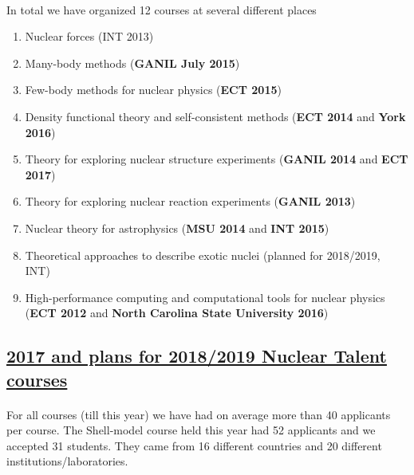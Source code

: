 \documentclass[%
oneside,                 %
final,                   %
10pt]{article}
\begin{document}
\paragraph{}
In total we have organized 12 courses at several different places
\begin{enumerate}
\item Nuclear forces (INT 2013)

\item Many-body methods (\textbf{GANIL July 2015})

\item Few-body methods for nuclear physics (\textbf{ECT 2015})

\item Density functional theory and self-consistent methods (\textbf{ECT 2014} and \textbf{York 2016})

\item Theory for exploring nuclear structure experiments (\textbf{GANIL 2014} and \textbf{ECT 2017})

\item Theory for exploring nuclear reaction experiments (\textbf{GANIL 2013})

\item Nuclear theory for astrophysics (\textbf{MSU 2014} and \textbf{INT 2015})

\item Theoretical approaches to describe  exotic nuclei (planned for 2018/2019, INT)

\item High-performance computing and computational tools for nuclear physics (\textbf{ECT 2012} and \textbf{North Carolina State University 2016})
\end{enumerate}

\noindent




\subsection{\href{{http://fribtheoryalliance.org/TALENT/courses/courses.php}}{2017 and plans for 2018/2019 Nuclear Talent courses}}

\paragraph{}
For all courses (till this year) we have had on average more than 40 applicants per course. The Shell-model course held this year had 52 applicants and we accepted 31 students. They came from 16 different countries and 20 different institutions/laboratories.
\end{document}
